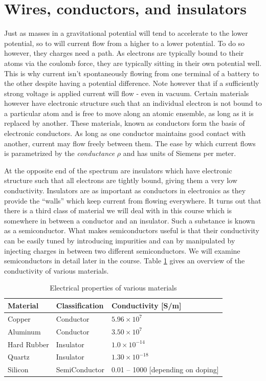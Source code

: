 \documentclass{tufte-book}
\begin{document}
\section{Wires, conductors, and insulators}
Just as masses in a gravitational potential will tend to accelerate to the lower potential, so to will current flow from a higher to a lower potential. To do so however, they charges need a path. As electrons are typically bound to their atoms via the coulomb force, they are typically sitting in their own potential well. This is why current isn't spontaneously flowing from one terminal of a battery to the other despite having a potential difference. Note however that if a sufficiently strong voltage is applied current will flow - even in vacuum. Certain materials however have electronic structure such that an individual electron is not bound to a particular atom and is free to move along an atomic ensemble, as long as it is replaced by another. These materials, known as conductors form the basis of electronic conductors. As long as one conductor maintains good contact with another, current may flow freely between them. The ease by which current flows is parametrized by the \textit{conductance} $\rho$ and has units of Siemens per meter.

At the opposite end of the spectrum are insulators which have electronic structure such that all electrons are tightly bound, giving them a very low conductivity. Insulators are as important as conductors in electronics as they provide the ``walls'' which keep current from flowing everywhere. It turns out that there is a third class of material we will deal with in this course which is somewhere in between a conductor and an insulator. Such a substance is known as a semiconductor. What makes semiconductors useful is that their conductivity can be easily tuned by introducing impurities and can by manipulated by injecting charges in between two different semiconductors. We will examine semiconductors in detail later in the course. Table \ref{tab:conduct} gives an overview of the conductivity of various materials.

\begin{table}[]
\centering
\caption{Electrical properties of various materials}
\label{tab:conduct}
\begin{tabular}{lll}
\hline
Material    & Classification & Conductivity {[}S/m{]} \\ \hline\hline
Copper      & Conductor      &          $5.96\times10^7$             \\
Aluminum        & Conductor      &             $3.50\times10^7$           \\
Hard Rubber        & Insulator      &             $1.0\times10^{-14}$      \\
Quartz        & Insulator      &             $1.30\times10^{-18}$           \\
 Silicon & SemiConductor      &          0.01 -- 1000 [depending on doping]            \\ \hline
\end{tabular}
\end{table}
\end{document}

